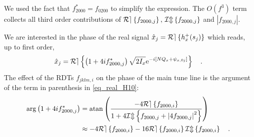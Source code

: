 We used the fact that $f_{2000}^* = f_{0200}$ to simplify the expression.
The $O(f^3) $ term collects all third order contributions of $\mathcal{Re} \left\{ f_{2000,j} \right\},\,\mathcal{Im} \left\{ f_{2000,j} \right\}$ and 
$\left| f_{2000,j}\right|$.

We are interested in the phase of the real signal $\hat{x}_j = \mathcal{Re} \left\{ h_x^+(s_j) \right\}$ which reads,
up to first order,
\begin{equation}
    \hat{x}_j = \mathcal{Re} \left\{ \left( 1+4if_{2000,j}^* \right) \sqrt{2I_x}\text{e}^{-i[ N Q_x+\psi_{x,0j}]} \right\}
  \quad .
  \label{eq_real_H10}
\end{equation}
The effect of the RDTs $f_{jklm,i}$ on the phase of the main tune
line is the argument of the term in parenthesis in \eqref{eq_real_H10}:
\begin{align}
 \arg\left( 1+4if_{2000,j}^* \right)
  &=   \mathrm{atan} \left(
   \frac{
     -4\mathcal{Re} \left\{  f_{2000,i} \right\}
   }{
     1 +4\mathcal{Im} \left\{ f_{2000,j} + \left| 4 f_{2000,j}\right|^2  \right\}
   } \right) \notag \\
  &\approx  -4 \mathcal{Re} \left\{ f_{2000,i} \right\} - 16 \mathcal{Re} \left\{ f_{2000,i} \right\}\mathcal{Im} \left\{ f_{2000,i} \right\}
 \quad .
\label{eq_thetaH}
\end{align}

